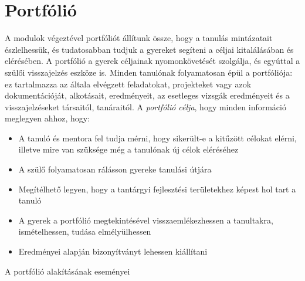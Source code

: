 \section{Portfólió}


A modulok végeztével portfóliót állítunk össze, hogy a tanulás mintázatait észlelhessük, és tudatosabban tudjuk a gyereket segíteni a céljai kitalálásában és elérésében. A portfólió a gyerek céljainak nyomonkövetését szolgálja, és egyúttal a szülői visszajelzés eszköze is. Minden tanulónak folyamatosan épül a portfóliója: ez tartalmazza az általa elvégzett feladatokat, projekteket vagy azok dokumentációját, alkotásait, eredményeit, az esetleges vizsgák eredményeit és a visszajelzéseket társaitól, tanáraitól. A \emph{portfólió célja}, hogy minden információ meglegyen ahhoz, hogy:

\begin{itemize}
\item A tanuló és mentora fel tudja mérni, hogy sikerült-e a kitűzött célokat elérni, illetve mire van szüksége még a tanulónak új célok eléréséhez

\item A szülő folyamatosan rálásson gyereke tanulási útjára

\item Megítélhető legyen, hogy a tantárgyi fejlesztési területekhez képest hol tart a tanuló

\item A gyerek a portfólió megtekintésével visszaemlékezhessen a tanultakra, ismételhessen, tudása elmélyülhessen

\item Eredményei alapján bizonyítványt lehessen kiállítani

\end{itemize}
A portfólió alakításának eseményei
